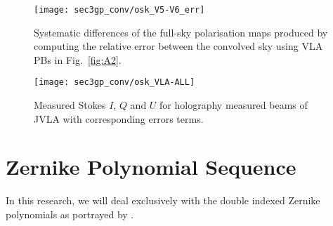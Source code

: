 \begin{appendices}
\begin{figure}
\begin{minipage}[H]{\linewidth}
      \centering
      \texttt{[image: sec3gp\_conv/osk\_V5-V6\_err]}
    \end{minipage}
     \caption{Systematic differences of the full-sky polarisation maps produced by computing the relative error between the convolved sky using VLA PBs in Fig.~\ref{fig:A2}.}  \label{fig:B1}
\end{figure}
    \FloatBarrier
%


\begin{figure}
\begin{minipage}[H]{\linewidth}
      \centering
      \texttt{[image: sec3gp\_conv/osk\_VLA-ALL]}
    \end{minipage}
     \caption{Measured Stokes $I$, $Q$ and $U$  for holography measured beams of JVLA with corresponding errors terms.}\label{fig:B2}
    \end{figure}
    \FloatBarrier
 
 \chapter{Zernike Polynomial Sequence} %
\label{appendix:A2}   
In this research, we will deal exclusively with the double indexed Zernike polynomials as portrayed by \citet{campbell2003new,lakshminarayanan2011zernike}. 


\end{appendices}
